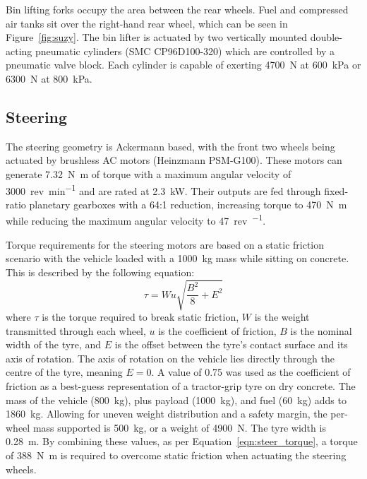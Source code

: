 \documentclass[preprint,authoryear,12pt]{elsarticle}
\begin{document}
        Bin lifting forks occupy the area between the rear wheels.
        Fuel and compressed air tanks sit over the right-hand rear wheel, which can be seen in Figure~\ref{fig:suzy}.
        The bin lifter is actuated by two vertically mounted double-acting pneumatic cylinders (SMC CP96D100-320) which are controlled by a pneumatic valve block.
        Each cylinder is capable of exerting \SI{4700}{\newton} at \SI{600}{\kilo\pascal} or \SI{6300}{\newton} at \SI{800}{\kilo\pascal}.


    \subsection{Steering}
    \label{sub:steering}

        The steering geometry is Ackermann based, with the front two wheels being actuated by brushless AC motors (Heinzmann PSM-G100).
        These motors can generate \SI{7.32}{\newton\meter} of torque with a maximum angular velocity of \SI{3000}{rev\per\minute} and are rated at \SI{2.3}{\kilo\watt}.
        Their outputs are fed through fixed-ratio planetary gearboxes with a 64:1 reduction, increasing torque to \SI{470}{\newton\meter} while reducing the maximum angular velocity to \SI{47}{rev\per\min}.

        Torque requirements for the steering motors are based on a static friction scenario with the vehicle loaded with a \SI{1000}{\kilo\gram} mass while sitting on concrete.
        This is described by the following equation:
        \begin{equation}
        \label{eqn:steer_torque}
        \tau = W u \sqrt{\frac{B^2}{8} + E^2}
        \end{equation}
        where $\tau$ is the torque required to break static friction, $W$ is the weight transmitted through each wheel, $u$ is the coefficient of friction, $B$ is the nominal width of the tyre, and $E$ is the offset between the tyre's contact surface and its axis of rotation.
        The axis of rotation on the vehicle lies directly through the centre of the tyre, meaning $E=0$.
        A value of 0.75 was used as the coefficient of friction as a best-guess representation of a tractor-grip tyre on dry concrete.
        The mass of the vehicle (\SI{800}{\kilo\gram}), plus payload (\SI{1000}{\kilo\gram}), and fuel (\SI{60}{\kilo\gram}) adds to \SI{1860}{\kilo\gram}.
        Allowing for uneven weight distribution and a safety margin, the per-wheel mass supported is \SI{500}{\kilo\gram}, or a weight of \SI{4900}{\newton}.
        The tyre width is \SI{0.28}{\meter}.
        By combining these values, as per Equation~\ref{eqn:steer_torque}, a torque of \SI{388}{\newton\meter} is required to overcome static friction when actuating the steering wheels.
\end{document}
